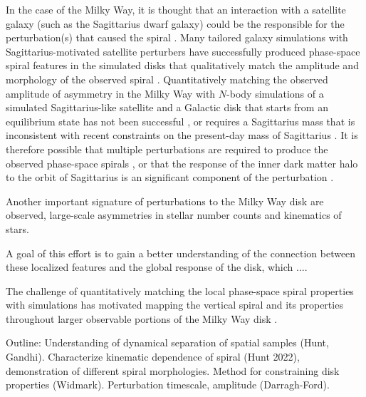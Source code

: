 In the case of the Milky Way, it is thought that an interaction with a satellite galaxy (such as the Sagittarius dwarf galaxy) could be the responsible for the perturbation(s) that caused the spiral \citep[e.g.,][]{Antoja:2018, Laporte:2019, Darling:2019}.
Many tailored galaxy simulations with Sagittarius-motivated satellite perturbers have successfully produced phase-space spiral features in the simulated disks that qualitatively match the amplitude and morphology of the observed spiral \citep{Khanna:2019, Laporte:2019, Bland-Hawthorn:2021, Hunt:2021, Gandhi:2022}.
Quantitatively matching the observed amplitude of asymmetry in the Milky Way with $N$-body simulations of a simulated Sagittarius-like satellite and a Galactic disk that starts from an equilibrium state has not been successful \citep{Bennett:2022}, or requires a Sagittarius mass that is inconsistent with recent constraints on the present-day mass of Sagittarius \citep{Vasiliev:XX}.
It is therefore possible that multiple perturbations are required to produce the observed phase-space spirals \citep[e.g.,][]{Garcia-Conde:2022}, or that the response of the inner dark matter halo to the orbit of Sagittarius is an significant component of the perturbation \citep{Grand:2022}.

Another important signature of perturbations to the Milky Way disk are observed, large-scale asymmetries in stellar number counts and kinematics of stars.

A goal of this effort is to gain a better understanding of the connection between these localized features and the global response of the disk, which ....



The challenge of quantitatively matching the local phase-space spiral properties with simulations has motivated mapping the vertical spiral and its properties throughout larger observable portions of the Milky Way disk \citep[e.g.,][]{XX}. %

Outline: Understanding of dynamical separation of spatial samples (Hunt, Gandhi). Characterize kinematic dependence of spiral (Hunt 2022), demonstration of different spiral morphologies. Method for constraining disk properties (Widmark). Perturbation timescale, amplitude (Darragh-Ford).

